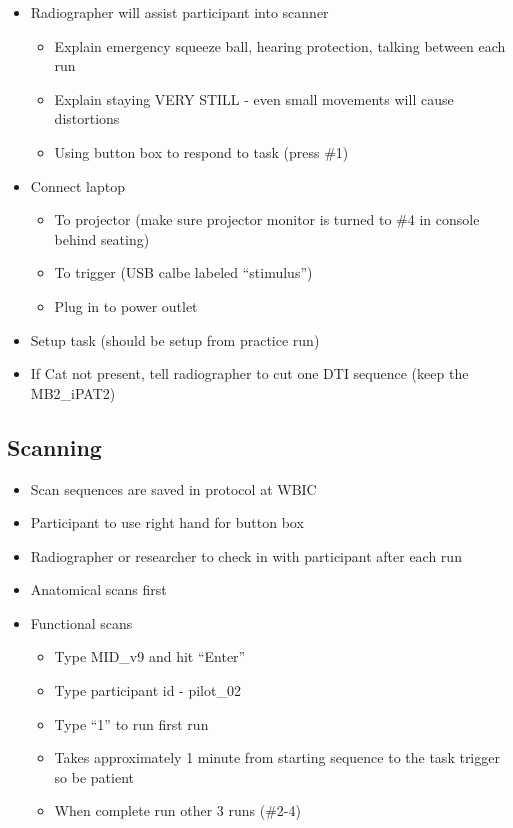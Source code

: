 \documentclass[
]{book}
\providecommand{\tightlist}{%
  \setlength{\itemsep}{0pt}\setlength{\parskip}{0pt}}
\begin{document}
\begin{itemize}
\item
  Radiographer will assist participant into scanner

  \begin{itemize}
  \tightlist
  \item
    Explain emergency squeeze ball, hearing protection, talking between each run
  \item
    Explain staying VERY STILL - even small movements will cause distortions
  \item
    Using button box to respond to task (press \#1)
  \end{itemize}
\item
  Connect laptop

  \begin{itemize}
  \tightlist
  \item
    To projector (make sure projector monitor is turned to \#4 in console behind seating)
  \item
    To trigger (USB calbe labeled ``stimulus'')
  \item
    Plug in to power outlet
  \end{itemize}
\item
  Setup task (should be setup from practice run)
\item
  If Cat not present, tell radiographer to cut one DTI sequence (keep the MB2\_iPAT2)
\end{itemize}

\hypertarget{scanning}{%
\subsection{Scanning}\label{scanning}}

\begin{itemize}
\item
  Scan sequences are saved in protocol at WBIC
\item
  Participant to use right hand for button box
\item
  Radiographer or researcher to check in with participant after each run
\item
  Anatomical scans first
\item
  Functional scans

  \begin{itemize}
  \tightlist
  \item
    Type MID\_v9 and hit ``Enter''
  \item
    Type participant id - pilot\_02
  \item
    Type ``1'' to run first run
  \item
    Takes approximately 1 minute from starting sequence to the task trigger so be patient
  \item
    When complete run other 3 runs (\#2-4)
  \end{itemize}
\end{itemize}
\end{document}
